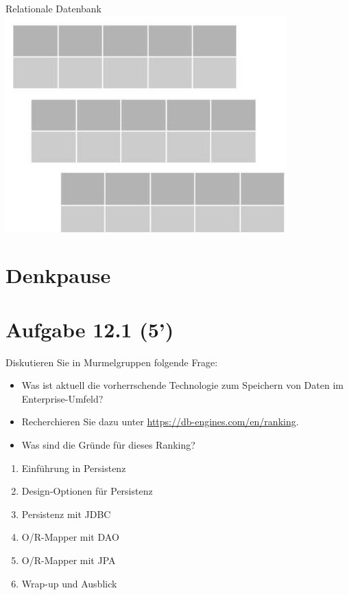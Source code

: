 \documentclass[10pt]{article}
\begin{document}
Relationale Datenbank\\
\includegraphics[width=\linewidth]{images/2025_01_02_5ba1dc702e9f94ba8e06g-06(1)}

\section*{Denkpause}
\section*{Aufgabe 12.1 (5')}
Diskutieren Sie in Murmelgruppen folgende Frage:

\begin{itemize}
  \item Was ist aktuell die vorherrschende Technologie zum Speichern von Daten im Enterprise-Umfeld?
  \item Recherchieren Sie dazu unter \href{https://db-engines.com/en/ranking}{https://db-engines.com/en/ranking}.
  \item Was sind die Gründe für dieses Ranking?
\end{itemize}

\begin{enumerate}
  \item Einführung in Persistenz
  \item Design-Optionen für Persistenz
  \item Persistenz mit JDBC
  \item O/R-Mapper mit DAO
  \item O/R-Mapper mit JPA
  \item Wrap-up und Ausblick
\end{enumerate}
\end{document}
